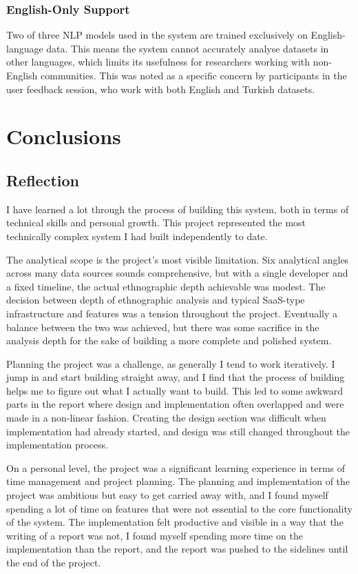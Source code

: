 \documentclass[12pt, a4paper]{article}
\begin{document}
\subsubsection{English-Only Support}
Two of three NLP models used in the system are trained exclusively on English-language data. This means the system cannot accurately analyse datasets in other languages, which limits its usefulness for researchers working with non-English communities. This was noted as a specific concern by participants in the user feedback session, who work with both English and Turkish datasets.

\newpage
\section{Conclusions}
\subsection{Reflection}
I have learned a lot through the process of building this system, both in terms of technical skills and personal growth. This project represented the most technically complex system I had built independently to date.

The analytical scope is the project's most visible limitation. Six analytical angles across many data sources sounds comprehensive, but with a single developer and a fixed timeline, the actual ethnographic depth achievable was modest. The decision between depth of ethnographic analysis and typical SaaS-type infrastructure and features was a tension throughout the project. Eventually a balance between the two was achieved, but there was some sacrifice in the analysis depth for the sake of building a more complete and polished system.

Planning the project was a challenge, as generally I tend to work iteratively. I jump in and start building straight away, and I find that the process of building helps me to figure out what I actually want to build. This led to some awkward parts in the report where design and implementation often overlapped and were made in a non-linear fashion. Creating the design section was difficult when implementation had already started, and design was still changed throughout the implementation process.

On a personal level, the project was a significant learning experience in terms of time management and project planning. The planning and implementation of the project was ambitious but easy to get carried away with, and I found myself spending a lot of time on features that were not essential to the core functionality of the system. The implementation felt productive and visible in a way that the writing of a report was not, I found myself spending more time on the implementation than the report, and the report was pushed to the sidelines until the end of the project.
\end{document}
